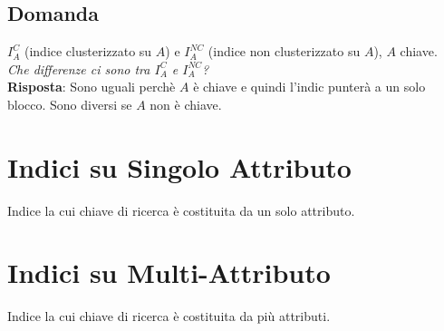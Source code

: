 \documentclass[12pt]{article}
\begin{document}
\subsection{Domanda}
$I_{A}^C$ (indice clusterizzato su $A$) e $I_{A}^{NC}$ (indice non clusterizzato su $A$), $A$ chiave.\\
\textit{Che differenze ci sono tra $I_{A}^C$ e $I_{A}^{NC}$?}\\
\textbf{Risposta}: Sono uguali perchè $A$ è chiave e quindi l'indic punterà a un solo blocco. Sono diversi se $A$ non è chiave.
\section{Indici su Singolo Attributo}
Indice la cui chiave di ricerca è costituita da un solo attributo.
\section{Indici su Multi-Attributo}
Indice la cui chiave di ricerca è costituita da più attributi.
\end{document}

